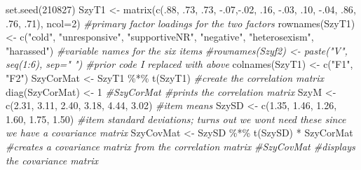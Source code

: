 \documentclass[
  english,
]{book}
\newenvironment{Shaded}{\begin{snugshade}}{\end{snugshade}}
\newcommand{\AttributeTok}[1]{\textcolor[rgb]{0.77,0.63,0.00}{#1}}
\newcommand{\CommentTok}[1]{\textcolor[rgb]{0.56,0.35,0.01}{\textit{#1}}}
\newcommand{\DecValTok}[1]{\textcolor[rgb]{0.00,0.00,0.81}{#1}}
\newcommand{\FloatTok}[1]{\textcolor[rgb]{0.00,0.00,0.81}{#1}}
\newcommand{\FunctionTok}[1]{\textcolor[rgb]{0.00,0.00,0.00}{#1}}
\newcommand{\NormalTok}[1]{#1}
\newcommand{\OtherTok}[1]{\textcolor[rgb]{0.56,0.35,0.01}{#1}}
\newcommand{\SpecialCharTok}[1]{\textcolor[rgb]{0.00,0.00,0.00}{#1}}
\newcommand{\StringTok}[1]{\textcolor[rgb]{0.31,0.60,0.02}{#1}}
\begin{document}
\begin{Shaded}
\begin{Highlighting}[]
\FunctionTok{set.seed}\NormalTok{(}\DecValTok{210827}\NormalTok{)}
\NormalTok{SzyT1 }\OtherTok{\textless{}{-}} \FunctionTok{matrix}\NormalTok{(}\FunctionTok{c}\NormalTok{(.}\DecValTok{88}\NormalTok{, .}\DecValTok{73}\NormalTok{, .}\DecValTok{73}\NormalTok{, }\SpecialCharTok{{-}}\NormalTok{.}\DecValTok{07}\NormalTok{,}\SpecialCharTok{{-}}\NormalTok{.}\DecValTok{02}\NormalTok{, .}\DecValTok{16}\NormalTok{, }\SpecialCharTok{{-}}\NormalTok{.}\DecValTok{03}\NormalTok{, .}\DecValTok{10}\NormalTok{, }\SpecialCharTok{{-}}\NormalTok{.}\DecValTok{04}\NormalTok{, .}\DecValTok{86}\NormalTok{, .}\DecValTok{76}\NormalTok{, .}\DecValTok{71}\NormalTok{), }\AttributeTok{ncol=}\DecValTok{2}\NormalTok{) }\CommentTok{\#primary factor loadings for the two factors}
\FunctionTok{rownames}\NormalTok{(SzyT1) }\OtherTok{\textless{}{-}} \FunctionTok{c}\NormalTok{(}\StringTok{"cold"}\NormalTok{, }\StringTok{"unresponsive"}\NormalTok{, }\StringTok{"supportiveNR"}\NormalTok{, }\StringTok{"negative"}\NormalTok{, }\StringTok{"heterosexism"}\NormalTok{, }\StringTok{"harassed"}\NormalTok{) }\CommentTok{\#variable names for the six items}
\CommentTok{\#rownames(Szyf2) \textless{}{-} paste("V", seq(1:6), sep=" ") \#prior code I replaced with above}
\FunctionTok{colnames}\NormalTok{(SzyT1) }\OtherTok{\textless{}{-}} \FunctionTok{c}\NormalTok{(}\StringTok{"F1"}\NormalTok{, }\StringTok{"F2"}\NormalTok{)}
\NormalTok{SzyCorMat }\OtherTok{\textless{}{-}}\NormalTok{ SzyT1 }\SpecialCharTok{\%*\%} \FunctionTok{t}\NormalTok{(SzyT1) }\CommentTok{\#create the correlation matrix}
\FunctionTok{diag}\NormalTok{(SzyCorMat) }\OtherTok{\textless{}{-}} \DecValTok{1}
\CommentTok{\#SzyCorMat \#prints the correlation matrix}
\NormalTok{SzyM }\OtherTok{\textless{}{-}} \FunctionTok{c}\NormalTok{(}\FloatTok{2.31}\NormalTok{, }\FloatTok{3.11}\NormalTok{, }\FloatTok{2.40}\NormalTok{, }\FloatTok{3.18}\NormalTok{, }\FloatTok{4.44}\NormalTok{, }\FloatTok{3.02}\NormalTok{) }\CommentTok{\#item means}
\NormalTok{SzySD }\OtherTok{\textless{}{-}} \FunctionTok{c}\NormalTok{(}\FloatTok{1.35}\NormalTok{, }\FloatTok{1.46}\NormalTok{, }\FloatTok{1.26}\NormalTok{, }\FloatTok{1.60}\NormalTok{, }\FloatTok{1.75}\NormalTok{, }\FloatTok{1.50}\NormalTok{) }\CommentTok{\#item standard deviations; turns out we won\textquotesingle{}t need these since we have a covariance matrix}
\NormalTok{SzyCovMat }\OtherTok{\textless{}{-}}\NormalTok{ SzySD }\SpecialCharTok{\%*\%} \FunctionTok{t}\NormalTok{(SzySD) }\SpecialCharTok{*}\NormalTok{ SzyCorMat }\CommentTok{\#creates a covariance matrix from the correlation matrix}
\CommentTok{\#SzyCovMat \#displays the covariance matrix}


\end{Highlighting}
\end{Shaded}
\end{document}
